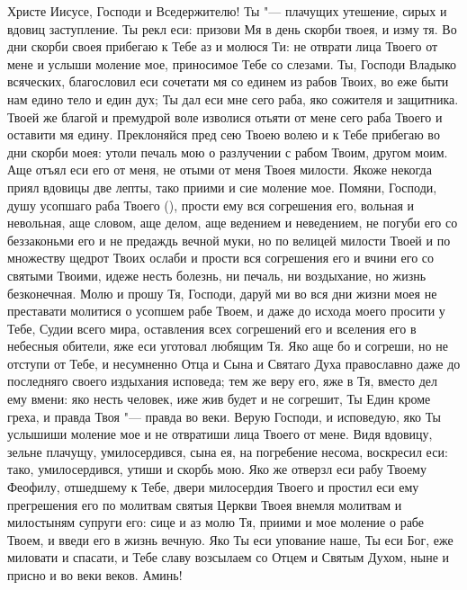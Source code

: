 \begin{mymulticols}
 


Христе Иисусе, Господи и Вседержителю! Ты "--- плачущих утешение, сирых и вдовиц заступление. Ты рекл еси: призови Мя в день скорби твоея, и изму тя. Во дни скорби своея прибегаю к Тебе аз и молюся Ти: не отврати лица Твоего от мене и услыши моление мое, приносимое Тебе со слезами. Ты, Господи Владыко всяческих, благословил еси сочетати мя со единем из рабов Твоих, во еже быти нам едино тело и един дух; Ты дал еси мне сего раба, яко сожителя и защитника. Твоей же благой и премудрой воле изволися отьяти от мене сего раба Твоего и оставити мя едину. Преклоняйся пред сею Твоею волею и к Тебе прибегаю во дни скорби моея: утоли печаль мою о разлучении с рабом Твоим, другом моим. Аще отъял еси его от меня, не отыми от меня Твоея милости. Якоже некогда приял вдовицы две лепты, тако приими и сие моление мое. Помяни, Господи, душу усопшаго раба Твоего (), прости ему вся согрешения его, вольная и невольная, аще словом, аще делом, аще ведением и неведением, не погуби его со беззаконьми его и не предаждь вечной муки, но по велицей милости Твоей и по множеству щедрот Твоих ослаби и прости вся согрешения его и вчини его со святыми Твоими, идеже несть болезнь, ни печаль, ни воздыхание, но жизнь безконечная. Молю и прошу Тя, Господи, даруй ми во вся дни жизни моея не преставати молитися о усопшем рабе Твоем, и даже до исхода моего просити у Тебе, Судии всего мира, оставления всех согрешений его и вселения его в небесныя обители, яже еси уготовал любящим Тя. Яко аще бо и согреши, но не отступи от Тебе, и несумненно Отца и Сына и Святаго Духа православно даже до последняго своего издыхания исповеда; тем же веру его, яже в Тя, вместо дел ему вмени: яко несть человек, иже жив будет и не согрешит, Ты Един кроме греха, и правда Твоя "--- правда во веки. Верую Господи, и исповедую, яко Ты услышиши моление мое и не отвратиши лица Твоего от мене. Видя вдовицу, зельне плачущу, умилосердився, сына ея, на погребение несома, воскресил еси: тако, умилосердився, утиши и скорбь мою. Яко же отверзл еси рабу Твоему Феофилу, отшедшему к Тебе, двери милосердия Твоего и простил еси ему прегрешения его по молитвам святыя Церкви Твоея внемля молитвам и милостыням супруги его: сице и аз молю Тя, приими и мое моление о рабе Твоем, и введи его в жизнь вечную. Яко Ты еси упование наше, Ты еси Бог, еже миловати и спасати, и Тебе славу возсылаем со Отцем и Святым Духом, ныне и присно и во веки веков. Аминь!

\end{mymulticols}

